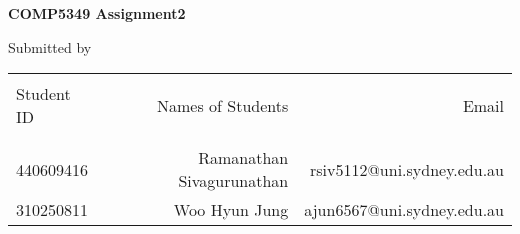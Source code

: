 \begin{titlepage}

\begin{center}

\Large \textbf {COMP5349 Assignment2}\\[0.5in]
      
        \vspace{.2in}

\normalsize Submitted by \\
\begin{table}[h]
\centering
\begin{tabular}{lrr}\hline \\
Student ID & Names of Students & Email\\ \\ \hline
\\
440609416 & Ramanathan Sivagurunathan & rsiv5112@uni.sydney.edu.au\\
310250811 & Woo Hyun Jung & ajun6567@uni.sydney.edu.au \\
\end{tabular}
\end{table}
\vfill

\end{center}

\end{titlepage}
